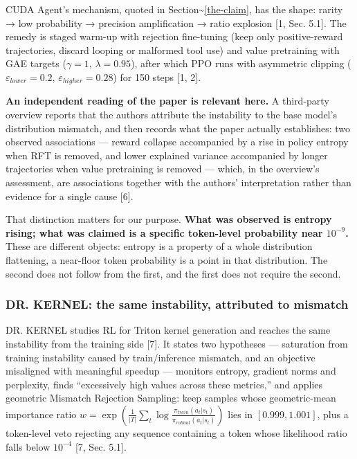 \documentclass[
  11pt,
]{article}
\begin{document}
CUDA Agent's mechanism, quoted in
Section\textasciitilde{}\ref{the-claim}, has the shape: rarity → low
probability → precision amplification → ratio explosion {[}1, Sec.
5.1{]}. The remedy is staged warm-up with rejection fine-tuning (keep
only positive-reward trajectories, discard looping or malformed tool
use) and value pretraining with GAE targets (\(\gamma=1\),
\(\lambda=0.95\)), after which PPO runs with asymmetric clipping
(\(\varepsilon_{lower}=0.2\), \(\varepsilon_{higher}=0.28\)) for 150
steps {[}1, 2{]}.

\textbf{An independent reading of the paper is relevant here.} A
third-party overview reports that the authors attribute the instability
to the base model's distribution mismatch, and then records what the
paper actually establishes: two observed associations --- reward
collapse accompanied by a rise in policy entropy when RFT is removed,
and lower explained variance accompanied by longer trajectories when
value pretraining is removed --- which, in the overview's assessment,
are associations together with the authors' interpretation rather than
evidence for a single cause {[}6{]}.

That distinction matters for our purpose. \textbf{What was observed is
entropy rising; what was claimed is a specific token-level probability
near \(10^{-9}\).} These are different objects: entropy is a property of
a whole distribution flattening, a near-floor token probability is a
point in that distribution. The second does not follow from the first,
and the first does not require the second.

\hypertarget{dr.-kernel-the-same-instability-attributed-to-mismatch}{%
\subsubsection{DR. KERNEL: the same instability, attributed to
mismatch}\label{dr.-kernel-the-same-instability-attributed-to-mismatch}}

DR. KERNEL studies RL for Triton kernel generation and reaches the same
instability from the training side {[}7{]}. It states two hypotheses ---
saturation from training instability caused by train/inference mismatch,
and an objective misaligned with meaningful speedup --- monitors
entropy, gradient norms and perplexity, finds ``excessively high values
across these metrics,'' and applies geometric Mismatch Rejection
Sampling: keep samples whose geometric-mean importance ratio
\(w = \exp(\frac{1}{|T|}\sum_t \log\frac{\pi_{train}(a_t|s_t)}{\pi_{rollout}(a_t|s_t)})\)
lies in \([0.999, 1.001]\), plus a token-level veto rejecting any
sequence containing a token whose likelihood ratio falls below
\(10^{-4}\) {[}7, Sec. 5.1{]}.
\end{document}
